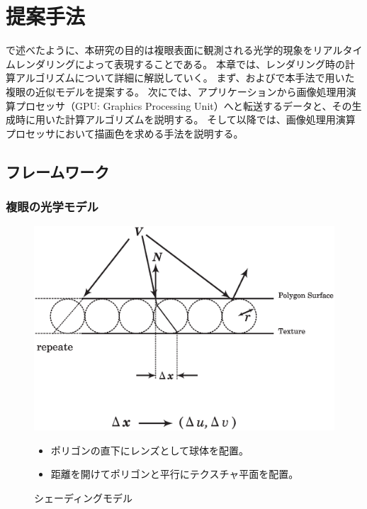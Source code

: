 \chapter{提案手法}
\label{CMethod}

で述べたように、本研究の目的は複眼表面に観測される光学的現象をリアルタイムレンダリングによって表現することである。
本章では、レンダリング時の計算アルゴリズムについて詳細に解説していく。
まず、およびで本手法で用いた複眼の近似モデルを提案する。
次にでは、アプリケーションから画像処理用演算プロセッサ（GPU: Graphics Processing Unit）へと転送するデータと、その生成時に用いた計算アルゴリズムを説明する。
そして以降では、画像処理用演算プロセッサにおいて描画色を求める手法を説明する。

\section{フレームワーク}
\label{SFramework}

\subsection{複眼の光学モデル}
\label{SSModel}

\begin{figure}[h]
  \centering
  \includegraphics[width=4.5in]{./img/surface_sphere.eps}
  \caption{シェーディングモデル}{\begin{itemize}\item ポリゴンの直下にレンズとして球体を配置。\item 距離を開けてポリゴンと平行にテクスチャ平面を配置。\end{itemize}}
  \label{FModel}
\end{figure}

